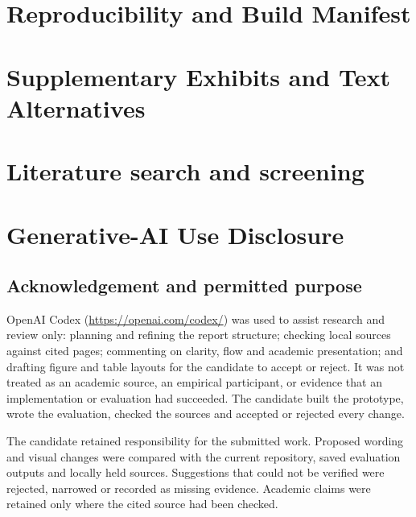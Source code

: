 \chapter{Reproducibility and Build Manifest}
\label{app:reproducibility-build}



\chapter{Supplementary Exhibits and Text Alternatives}
\label{app:supplementary-exhibits}








\chapter{Literature search and screening}
\label{app:literature-search}


\chapter{Generative-AI Use Disclosure}
\label{app:generative-ai-disclosure}

\section*{Acknowledgement and permitted purpose}

OpenAI Codex (\url{https://openai.com/codex/}) was used to assist research and review only:
planning and refining the report structure; checking local sources against cited pages;
commenting on clarity, flow and academic presentation; and drafting figure and table layouts
for the candidate to accept or reject. It was not treated as an academic source, an empirical
participant, or evidence that an implementation or evaluation had succeeded. The candidate
built the prototype, wrote the evaluation, checked the sources and accepted or rejected every
change.

The candidate retained responsibility for the submitted work. Proposed wording and visual
changes were compared with the current repository, saved evaluation outputs and locally held
sources. Suggestions that could not be verified were rejected, narrowed or recorded as missing
evidence. Academic claims were retained only where the cited source had been checked.

